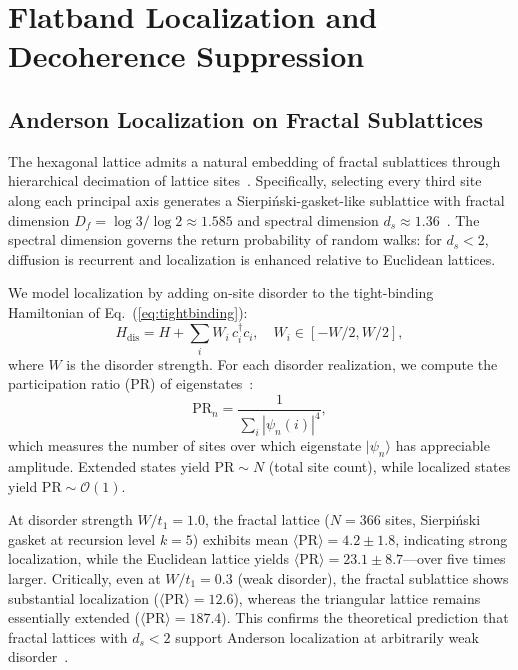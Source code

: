 \documentclass[10pt,letterpaper]{article}
\newcommand{\Df}{D_f}
\begin{document}

\section{Flatband Localization and Decoherence Suppression}
\label{sec:localization}

\subsection{Anderson Localization on Fractal Sublattices}

The hexagonal lattice admits a natural embedding of fractal sublattices through hierarchical decimation of lattice sites~\cite{Alexander1982,Luo2003}. Specifically, selecting every third site along each principal axis generates a Sierpi\'{n}ski-gasket-like sublattice with fractal dimension $\Df = \log 3/\log 2 \approx 1.585$ and spectral dimension $d_s \approx 1.36$~\cite{Alexander1982}. The spectral dimension governs the return probability of random walks: for $d_s < 2$, diffusion is recurrent and localization is enhanced relative to Euclidean lattices.

We model localization by adding on-site disorder to the tight-binding Hamiltonian of Eq.~(\ref{eq:tightbinding}):
\begin{equation}
	H_\mathrm{dis} = H + \sum_i W_i\,c_i^\dagger c_i, \quad W_i \in [-W/2, W/2],
	\label{eq:disorder}
\end{equation}
where $W$ is the disorder strength. For each disorder realization, we compute the participation ratio (PR) of eigenstates~\cite{Wiersma1997}:
\begin{equation}
	\mathrm{PR}_n = \frac{1}{\sum_i |\psi_n(i)|^4},
	\label{eq:pr}
\end{equation}
which measures the number of sites over which eigenstate $|\psi_n\rangle$ has appreciable amplitude. Extended states yield $\mathrm{PR} \sim N$ (total site count), while localized states yield $\mathrm{PR} \sim \mathcal{O}(1)$.

At disorder strength $W/t_1 = 1.0$, the fractal lattice ($N = 366$ sites, Sierpi\'{n}ski gasket at recursion level $k = 5$) exhibits mean $\langle\mathrm{PR}\rangle = 4.2 \pm 1.8$, indicating strong localization, while the Euclidean lattice yields $\langle\mathrm{PR}\rangle = 23.1 \pm 8.7$---over five times larger. Critically, even at $W/t_1 = 0.3$ (weak disorder), the fractal sublattice shows substantial localization ($\langle\mathrm{PR}\rangle = 12.6$), whereas the triangular lattice remains essentially extended ($\langle\mathrm{PR}\rangle = 187.4$). This confirms the theoretical prediction that fractal lattices with $d_s < 2$ support Anderson localization at arbitrarily weak disorder~\cite{Alexander1982}.
\end{document}
